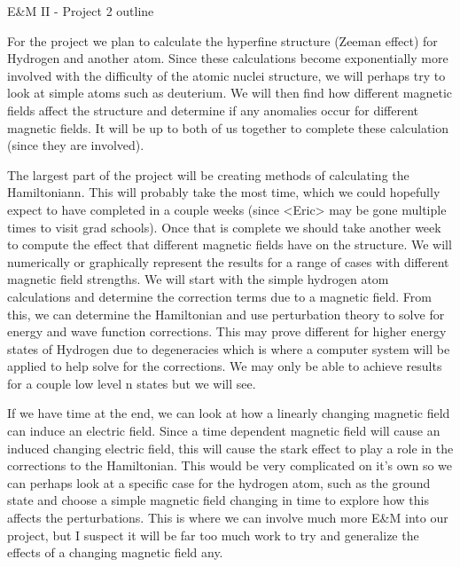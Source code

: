 \documentclass[11pt]{article}
\begin{document}
 

\begin{center}
	{\Large E\&M II - Project 2 outline}
\end{center}

For the project we plan to calculate the hyperfine structure (Zeeman effect) for Hydrogen and
another atom. Since these calculations become exponentially more involved with the difficulty of
the atomic nuclei structure, we will perhaps try to look at simple atoms such as deuterium. We
will then find how different magnetic fields affect the structure and determine if any anomalies
occur for different magnetic fields. It will be up to both of us together to complete these
calculation (since they are involved).

The largest part of the project will be creating methods of calculating the Hamiltoniann. This will
probably take the most time, which we could hopefully expect to have completed in a couple
weeks (since <Eric> may be gone multiple times to visit grad schools). Once that is complete
we should take another week to compute the effect that different magnetic fields have on the
structure. We will numerically or graphically represent the results for a range of cases with
different magnetic field strengths. We will start with the simple hydrogen atom calculations and
determine the correction terms due to a magnetic field. From this, we can determine the
Hamiltonian and use perturbation theory to solve for energy and wave function corrections. This
may prove different for higher energy states of Hydrogen due to degeneracies which is where a
computer system will be applied to help solve for the corrections. We may only be able to
achieve results for a couple low level n states but we will see.

If we have time at the end, we can look at how a linearly changing magnetic field can induce an
electric field. Since a time dependent magnetic field will cause an induced changing electric
field, this will cause the stark effect to play a role in the corrections to the Hamiltonian. This
would be very complicated on it’s own so we can perhaps look at a specific case for the
hydrogen atom, such as the ground state and choose a simple magnetic field changing in time
to explore how this affects the perturbations. This is where we can involve much more E\&M into
our project, but I suspect it will be far too much work to try and generalize the effects of a
changing magnetic field any.



\end{document}
